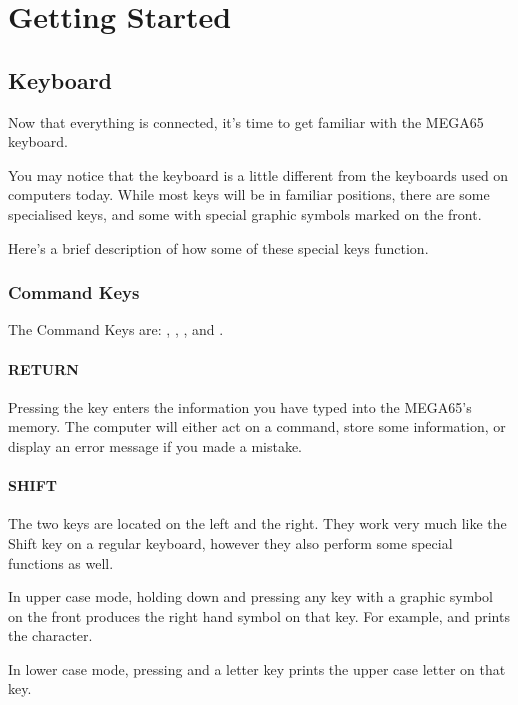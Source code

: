 \chapter{Getting Started}
\section{Keyboard}
\label{cha:getting-started}

Now that everything is connected, it's time to get familiar with the MEGA65 keyboard.

You may notice that the keyboard is a little different from the keyboards used on computers today. While most keys will be in familiar positions, there are some specialised keys, and some with special graphic symbols marked on the front.

Here's a brief description of how some of these special keys function.

\subsection{Command Keys}

The Command Keys are: , , , \megasymbolkey and .

\subsubsection{RETURN}

Pressing the  key enters the information you have typed into the MEGA65's memory. The computer will either act on a command, store some information, or display an error message if you made a mistake.

\subsubsection{SHIFT}

The two  keys are located on the left and the right. They work very much like the Shift key on a regular keyboard, however they also perform some special functions as well.

In upper case mode, holding down  and pressing any key with a graphic symbol on the front produces the right hand symbol on that key. For example,  and  prints the character.

In lower case mode, pressing  and a letter key prints the upper case letter on that key.

